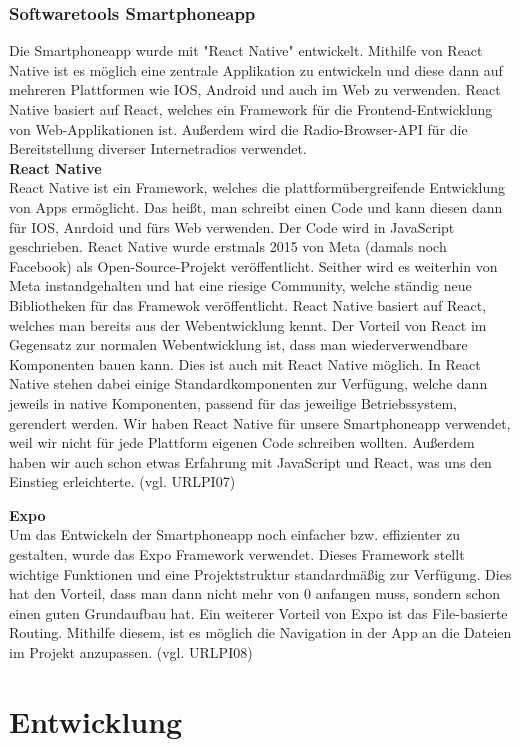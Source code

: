 \documentclass[]{article}
\begin{document}
\subsubsection{Softwaretools Smartphoneapp}
Die Smartphoneapp wurde mit "React Native" entwickelt. Mithilfe von React Native ist es möglich eine zentrale Applikation zu entwickeln und diese dann auf mehreren Plattformen wie IOS, Android und auch im Web zu verwenden. React Native basiert auf React, welches ein Framework für die Frontend-Entwicklung von Web-Applikationen ist. Außerdem wird die Radio-Browser-API für die Bereitstellung diverser Internetradios verwendet. \\

\textbf{React Native} \\
React Native ist ein Framework, welches die plattformübergreifende Entwicklung von Apps ermöglicht. Das heißt, man schreibt einen Code und kann diesen dann für IOS, Anrdoid und fürs Web verwenden. Der Code wird in JavaScript geschrieben. React Native wurde erstmals 2015 von Meta (damals noch Facebook) als Open-Source-Projekt veröffentlicht. Seither wird es weiterhin von Meta instandgehalten und hat eine riesige Community, welche ständig neue Bibliotheken für das Framewok veröffentlicht. React Native basiert auf React, welches man bereits aus der Webentwicklung kennt. Der Vorteil von React im Gegensatz zur normalen Webentwicklung ist, dass man wiederverwendbare Komponenten bauen kann. Dies ist auch mit React Native möglich. In React Native stehen dabei einige Standardkomponenten zur Verfügung, welche dann jeweils in native Komponenten, passend für das jeweilige Betriebssystem, gerendert werden. 
Wir haben React Native für unsere Smartphoneapp verwendet, weil wir nicht für jede Plattform eigenen Code schreiben wollten. Außerdem haben wir auch schon etwas Erfahrung mit JavaScript und React, was uns den Einstieg erleichterte.
(vgl. URLPI07)

\textbf{Expo} \\
Um das Entwickeln der Smartphoneapp noch einfacher bzw. effizienter zu gestalten, wurde das Expo Framework verwendet. Dieses Framework stellt wichtige Funktionen und eine Projektstruktur standardmäßig zur Verfügung. Dies hat den Vorteil, dass man dann nicht mehr von 0 anfangen muss, sondern schon einen guten Grundaufbau hat. Ein weiterer Vorteil von Expo ist das File-basierte Routing. Mithilfe diesem, ist es möglich die Navigation in der App an die Dateien im Projekt anzupassen.
(vgl. URLPI08)

\section{Entwicklung}
\end{document}
